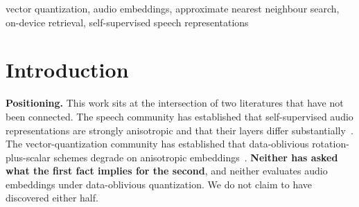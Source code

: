 \documentclass[conference]{IEEEtran}
\begin{document}
\begin{IEEEkeywords}
vector quantization, audio embeddings, approximate nearest neighbour search, on-device retrieval,
self-supervised speech representations
\end{IEEEkeywords}

\section{Introduction}

\textbf{Positioning.} This work sits at the intersection of two literatures that have not been
connected. The speech community has established that self-supervised audio representations are
strongly anisotropic and that their layers differ substantially~\cite{pasad2021,pasad2023,liu2024}.
The vector-quantization community has established that data-oblivious rotation-plus-scalar schemes
degrade on anisotropic embeddings~\cite{qdrant2025}. \textbf{Neither has asked what the first fact
implies for the second}, and neither evaluates audio embeddings under data-oblivious quantization.
We do not claim to have discovered either half.
\end{document}
